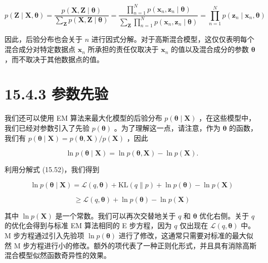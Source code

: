 \documentclass[10pt]{report}
\begin{document}
\[
p\left( {\mathbf{Z} \mid  \mathbf{X},\mathbf{\theta }}\right)  = \frac{p\left( {\mathbf{X},\mathbf{Z} \mid  \mathbf{\theta }}\right) }{\mathop{\sum }\limits_{\mathbf{Z}}p\left( {\mathbf{X},\mathbf{Z} \mid  \mathbf{\theta }}\right) } = \frac{\mathop{\prod }\limits_{{n = 1}}^{N}p\left( {{\mathbf{x}}_{n},{\mathbf{z}}_{n} \mid  \mathbf{\theta }}\right) }{\mathop{\sum }\limits_{\mathbf{Z}}\mathop{\prod }\limits_{{n = 1}}^{N}p\left( {{\mathbf{x}}_{n},{\mathbf{z}}_{n} \mid  \mathbf{\theta }}\right) } = \mathop{\prod }\limits_{{n = 1}}^{N}p\left( {{\mathbf{z}}_{n} \mid  {\mathbf{x}}_{n},\mathbf{\theta }}\right)  \tag{15.57}
\]

因此，后验分布也会关于 \(n\) 进行因式分解。对于高斯混合模型，这仅仅表明每个混合成分对特定数据点 \({\mathbf{x}}_{n}\) 所承担的责任仅取决于 \({\mathbf{x}}_{n}\) 的值以及混合成分的参数 \(\mathbf{\theta }\) ，而不取决于其他数据点的值。

\section*{15.4.3 参数先验}

我们还可以使用 EM 算法来最大化模型的后验分布 \(p\left( {\mathbf{\theta } \mid  \mathbf{X}}\right)\) ，在这些模型中，我们已经对参数引入了先验 \(p\left( \mathbf{\theta }\right)\) 。为了理解这一点，请注意，作为 \(\mathbf{\theta }\) 的函数，我们有 \(p\left( {\mathbf{\theta } \mid  \mathbf{X}}\right)  = p\left( {\mathbf{\theta },\mathbf{X}}\right) /p\left( \mathbf{X}\right)\) ，因此

\[
\ln p\left( {\mathbf{\theta } \mid  \mathbf{X}}\right)  = \ln p\left( {\mathbf{\theta },\mathbf{X}}\right)  - \ln p\left( \mathbf{X}\right) . \tag{15.58}
\]

利用分解式 (15.52)，我们得到

\[
\ln p\left( {\mathbf{\theta } \mid  \mathbf{X}}\right)  = \mathcal{L}\left( {q,\mathbf{\theta }}\right)  + \mathrm{{KL}}\left( {q\parallel p}\right)  + \ln p\left( \mathbf{\theta }\right)  - \ln p\left( \mathbf{X}\right)
\]

\[
\geq  \mathcal{L}\left( {q,\mathbf{\theta }}\right)  + \ln p\left( \mathbf{\theta }\right)  - \ln p\left( \mathbf{X}\right)  \tag{15.59}
\]

其中 \(\ln p\left( \mathbf{X}\right)\) 是一个常数。我们可以再次交替地关于 \(q\) 和 \(\mathbf{\theta }\) 优化右侧。关于 \(q\) 的优化会得到与标准 EM 算法相同的 E 步方程，因为 \(q\) 仅出现在 \(\mathcal{L}\left( {q,\mathbf{\theta }}\right)\) 中。M 步方程通过引入先验项 \(\ln p\left( \mathbf{\theta }\right)\) 进行了修改，这通常只需要对标准的最大似然 M 步方程进行小的修改。额外的项代表了一种正则化形式，并且具有消除高斯混合模型似然函数奇异性的效果。
\end{document}

